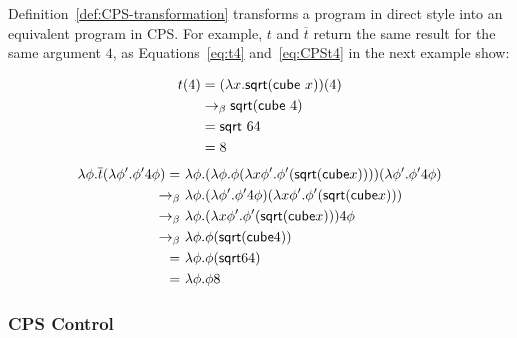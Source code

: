 Definition~\ref{def:CPS-transformation} transforms a program in direct style into an equivalent program in CPS. For example, $t$ and $\overline{t}$ return the same result for the same argument $4$, as Equations~\eqref{eq:t4} and~\eqref{eq:CPSt4} in the next example show: 
\begin{example}
\begin{align} 
t(4) & = (\lambda x. \mathsf{sqrt} (\mathsf{cube} \ x))(4) \notag\\
& \rightarrow_\beta \mathsf{sqrt} (\mathsf{cube} \ 4) \notag \\
& =  \mathsf{sqrt} \ 64 \notag \\
& = 8 \label{eq:t4}
\end{align}
%
\begin{align}
\lambda \phi. \overline{t} (\lambda \phi'. \phi' 4 \phi) = \ & \lambda \phi. (\lambda \phi. \phi ( \lambda x \phi'. \phi' (\mathsf{sqrt} (\mathsf{cube} x) ) )) (\lambda \phi'. \phi' 4 \phi) \notag \\
\rightarrow_\beta \ & \lambda \phi.  (\lambda \phi'. \phi' 4 \phi)  ( \lambda x \phi'. \phi' (\mathsf{sqrt} (\mathsf{cube} x) ) ) \notag \\
\rightarrow_\beta \ & \lambda \phi.   ( \lambda x \phi'. \phi' (\mathsf{sqrt} (\mathsf{cube} x) ) ) 4 \phi \notag \\
\rightarrow_\beta \ & \lambda \phi. \phi (\mathsf{sqrt} (\mathsf{cube} 4) )   \notag \\
= \ & \lambda \phi. \phi (\mathsf{sqrt} 64 )   \notag \\
= \ & \lambda \phi. \phi 8   \label{eq:CPSt4}  
\end{align}
\end{example}

\subsubsection{CPS Control} \label{subsubsec:CPSControl}

